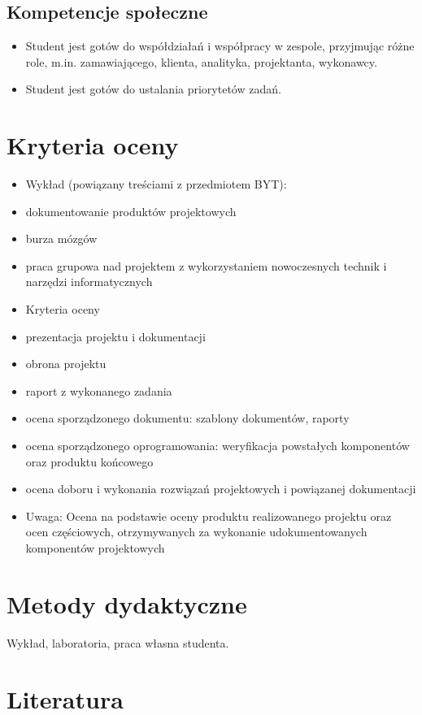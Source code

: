 \documentclass[12pt, a4paper]{article}
\begin{document}
\subsection*{Kompetencje społeczne}
\begin{itemize}
  \item Student jest gotów do współdziałań i współpracy w zespole, przyjmując różne role, m.in. zamawiającego, klienta, analityka, projektanta, wykonawcy.
  \item Student jest gotów do ustalania priorytetów zadań.
\end{itemize}

\section{Kryteria oceny}

\begin{itemize}
  \item Wykład (powiązany treściami z przedmiotem BYT):
  \item dokumentowanie produktów projektowych
  \item burza mózgów
  \item praca grupowa nad projektem z wykorzystaniem nowoczesnych technik i narzędzi informatycznych
  \item Kryteria oceny
  \item prezentacja projektu i dokumentacji
  \item obrona projektu
  \item raport z wykonanego zadania
  \item ocena sporządzonego dokumentu: szablony dokumentów, raporty
  \item ocena sporządzonego oprogramowania: weryfikacja powstałych komponentów oraz produktu końcowego
  \item ocena doboru i wykonania rozwiązań projektowych i powiązanej dokumentacji
  \item Uwaga: Ocena na podstawie oceny produktu realizowanego projektu oraz ocen częściowych, otrzymywanych za wykonanie udokumentowanych komponentów projektowych
\end{itemize}

\section{Metody dydaktyczne}

Wykład, laboratoria, praca własna studenta.

\section{Literatura}
\end{document}
